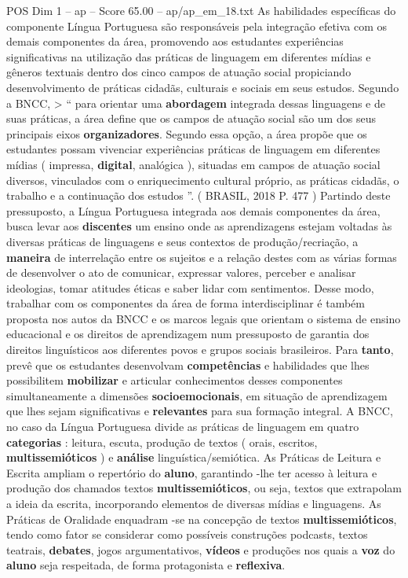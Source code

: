 \begin{textsample}{POS Dim 1 – ap – Score 65.00 – ap/ap\_em\_18.txt}
As habilidades específicas do componente Língua Portuguesa são responsáveis pela integração efetiva com os demais componentes da área, promovendo aos estudantes experiências significativas na utilização das práticas de linguagem em diferentes mídias e gêneros textuais dentro dos cinco campos de atuação social propiciando desenvolvimento de práticas cidadãs, culturais e sociais em seus estudos.
Segundo a BNCC, > “ para orientar uma \textbf{abordagem} integrada dessas linguagens e de suas práticas, a área define que os campos de atuação social são um dos seus principais eixos \textbf{organizadores}.
Segundo essa opção, a área propõe que os estudantes possam vivenciar experiências práticas de linguagem em diferentes mídias ( impressa, \textbf{digital}, analógica ), situadas em campos de atuação social diversos, vinculados com o enriquecimento cultural próprio, as práticas cidadãs, o trabalho e a continuação dos estudos ”. ( BRASIL, 2018 P. 477 ) Partindo deste pressuposto, a Língua Portuguesa integrada aos demais componentes da área, busca levar aos \textbf{discentes} um ensino onde as aprendizagens estejam voltadas às diversas práticas de linguagens e seus contextos de produção/recriação, a \textbf{maneira} de interrelação entre os sujeitos e a relação destes com as várias formas de desenvolver o ato de comunicar, expressar valores, perceber e analisar ideologias, tomar atitudes éticas e saber lidar com sentimentos.
Desse modo, trabalhar com os componentes da área de forma interdisciplinar é também proposta nos autos da BNCC e os marcos legais que orientam o sistema de ensino educacional e os direitos de aprendizagem num pressuposto de garantia dos direitos linguísticos aos diferentes povos e grupos sociais brasileiros.
Para \textbf{tanto}, prevê que os estudantes desenvolvam \textbf{competências} e habilidades que lhes possibilitem \textbf{mobilizar} e articular conhecimentos desses componentes simultaneamente a dimensões \textbf{socioemocionais}, em situação de aprendizagem que lhes sejam significativas e \textbf{relevantes} para sua formação integral.
A BNCC, no caso da Língua Portuguesa divide as práticas de linguagem em quatro \textbf{categorias} : leitura, escuta, produção de textos ( orais, escritos, \textbf{multissemióticos} ) e \textbf{análise} linguística/semiótica.
As Práticas de Leitura e Escrita ampliam o repertório do \textbf{aluno}, garantindo -lhe ter acesso à leitura e produção dos chamados textos \textbf{multissemióticos}, ou seja, textos que extrapolam a ideia da escrita, incorporando elementos de diversas mídias e linguagens.
As Práticas de Oralidade enquadram -se na concepção de textos \textbf{multissemióticos}, tendo como fator se considerar como possíveis construções podcasts, textos teatrais, \textbf{debates}, jogos argumentativos, \textbf{vídeos} e produções nos quais a \textbf{voz} do \textbf{aluno} seja respeitada, de forma protagonista e \textbf{reflexiva}.

\end{textsample}
